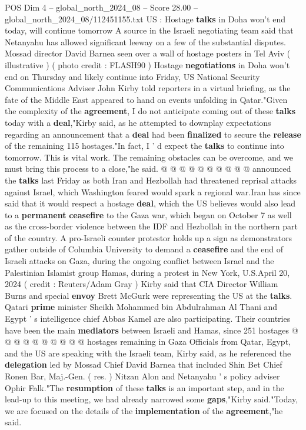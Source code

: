 \begin{textsample}{POS Dim 4 – global\_north\_2024\_08 – Score 28.00 – global\_north\_2024\_08/112451155.txt}  \label{ex:f4_pos_161}
US : Hostage \textbf{talks} in Doha won't end today, will continue tomorrow A source in the Israeli negotiating team said that Netanyahu has allowed significant leeway on a few of the substantial disputes.
Mossad director David Barnea seen over a wall of hostage posters in Tel Aviv ( illustrative ) ( photo credit : FLASH90 ) Hostage \textbf{negotiations} in Doha won't end on Thursday and likely continue into Friday, US National Security Communications Adviser John Kirby told reporters in a virtual briefing, as the fate of the Middle East appeared to hand on events unfolding in Qatar."Given the complexity of the \textbf{agreement}, I do not anticipate coming out of these \textbf{talks} today with a \textbf{deal},"Kirby said, as he attempted to downplay expectations regarding an announcement that a \textbf{deal} had been \textbf{finalized} to secure the \textbf{release} of the remaining 115 hostages."In fact, I ' d expect the \textbf{talks} to continue into tomorrow.
This is vital work.
The remaining obstacles can be overcome, and we must bring this process to a close,"he said. @ @ @ @ @ @ @ @ @ @ announced the \textbf{talks} last Friday as both Iran and Hezbollah had threatened reprisal attacks against Israel, which Washington feared would spark a regional war.Iran has since said that it would respect a hostage \textbf{deal}, which the US believes would also lead to a \textbf{permanent} \textbf{ceasefire} to the Gaza war, which began on October 7 as well as the cross-border violence between the IDF and Hezbollah in the northern part of the country.
A pro-Israeli counter protestor holds up a sign as demonstrators gather outside of Columbia University to demand a \textbf{ceasefire} and the end of Israeli attacks on Gaza, during the ongoing conflict between Israel and the Palestinian Islamist group Hamas, during a protest in New York, U.S.April 20, 2024 ( credit : Reuters/Adam Gray ) Kirby said that CIA Director William Burns and special \textbf{envoy} Brett McGurk were representing the US at the \textbf{talks}.
Qatari \textbf{prime} minister Sheikh Mohammed bin Abdulrahman Al Thani and Egypt ' s intelligence chief Abbas Kamel are also participating.
Their countries have been the main \textbf{mediators} between Israeli and Hamas, since 251 hostages @ @ @ @ @ @ @ @ @ @ hostages remaining in Gaza Officials from Qatar, Egypt, and the US are speaking with the Israeli team, Kirby said, as he referenced the \textbf{delegation} led by Mossad Chief David Barnea that included Shin Bet Chief Ronen Bar, Maj.-Gen. ( res. ) Nitzan Alon and Netanyahu ' s policy adviser Ophir Falk."The \textbf{resumption} of these \textbf{talks} is an important step, and in the lead-up to this meeting, we had already narrowed some \textbf{gaps},"Kirby said."Today, we are focused on the details of the \textbf{implementation} of the \textbf{agreement},"he said.

\end{textsample}
